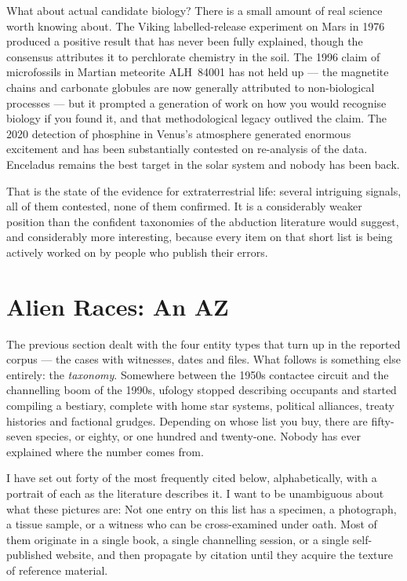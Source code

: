 What about actual candidate biology? There is a small amount of real science worth knowing
about. The Viking labelled-release experiment on Mars in 1976 produced a positive result that
has never been fully explained, though the consensus attributes it to perchlorate chemistry in
the soil. The 1996 claim of microfossils in Martian meteorite ALH~84001 has not held up ---
the magnetite chains and carbonate globules are now generally attributed to non-biological
processes --- but it prompted a generation of work on how you would recognise biology if you
found it, and that methodological legacy outlived the claim. The 2020 detection of phosphine
in Venus's atmosphere generated enormous excitement and has been substantially contested on
re-analysis of the data. Enceladus remains the best target in the solar system and nobody
has been back.

That is the state of the evidence for extraterrestrial life: several intriguing signals, all
of them contested, none of them confirmed. It is a considerably weaker position than the
confident taxonomies of the abduction literature would suggest, and considerably more
interesting, because every item on that short list is being actively worked on by people who
publish their errors.

\section{Alien Races: An A\ndash{}Z}\label{sec:racesaz}

The previous section dealt with the four entity types that turn up in the reported corpus ---
the cases with witnesses, dates and files. What follows is something else entirely: the
\emph{taxonomy}. Somewhere between the 1950s contactee circuit and the channelling boom of the
1990s, ufology stopped describing occupants and started compiling a bestiary, complete with
home star systems, political alliances, treaty histories and factional grudges. Depending on
whose list you buy, there are fifty-seven species, or eighty, or one hundred and twenty-one.
Nobody has ever explained where the number comes from.

I have set out forty of the most frequently cited below, alphabetically, with a
portrait of each as the literature describes it. I want to be unambiguous about what these
pictures are:  Not one entry on this
list has a specimen, a photograph, a tissue sample, or a witness who can be cross-examined
under oath. Most of them originate in a single book, a single channelling session, or a single
self-published website, and then propagate by citation until they acquire the texture of
reference material.

